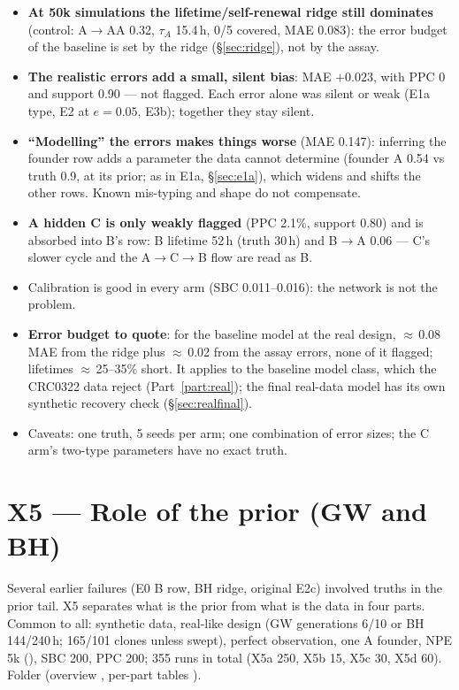 \documentclass[10pt,a4paper]{article}
\newcommand{\tA}{$\tau_A$}
\newcommand{\res}[1]{\texttt{\detokenize{#1}}}  %
\newcommand{\code}[1]{\texttt{\detokenize{#1}}}
\begin{document}
\begin{itemize}
\item \textbf{At 50k simulations the lifetime/self-renewal ridge still dominates} (control: A$\to$AA 0.32, \tA{} 15.4\,h, 0/5 covered, MAE 0.083): the error budget of the baseline is set by the ridge (\S\ref{sec:ridge}), not by the assay.
\item \textbf{The realistic errors add a small, silent bias}: MAE $+0.023$, with PPC 0 and support 0.90 --- not flagged. Each error alone was silent or weak (E1a type, E2 at $e = 0.05$, E3b); together they stay silent.
\item \textbf{``Modelling'' the errors makes things worse} (MAE 0.147): inferring the founder row adds a parameter the data cannot determine (founder A 0.54 vs truth 0.9, at its prior; as in E1a, \S\ref{sec:e1a}), which widens and shifts the other rows. Known mis-typing and shape do not compensate.
\item \textbf{A hidden C is only weakly flagged} (PPC 2.1\%, support 0.80) and is absorbed into B's row: B lifetime 52\,h (truth 30\,h) and B$\to$A 0.06 --- C's slower cycle and the A$\to$C$\to$B flow are read as B.
\item Calibration is good in every arm (SBC 0.011--0.016): the network is not the problem.
\item \textbf{Error budget to quote}: for the baseline model at the real design, $\approx$\,0.08 MAE from the ridge plus $\approx$\,0.02 from the assay errors, none of it flagged; lifetimes $\approx$\,25--35\% short. It applies to the baseline model class, which the CRC0322 data reject (Part~\ref{part:real}); the final real-data model has its own synthetic recovery check (\S\ref{sec:realfinal}).
\item Caveats: one truth, 5 seeds per arm; one combination of error sizes; the C arm's two-type parameters have no exact truth.
\end{itemize}

\section{X5 --- Role of the prior (GW and BH)}\label{sec:x5}
Several earlier failures (E0 B row, BH ridge, original E2c) involved truths in the prior tail. X5 separates what is the prior from what is the data in four parts. Common to all: synthetic data, real-like design (GW generations 6/10 or BH 144/240\,h; 165/101 clones unless swept), perfect observation, one A founder, NPE 5k (\code{budget=dev}), SBC 200, PPC 200; 355 runs in total (X5a 250, X5b 15, X5c 30, X5d 60). Folder \res{results/x5/} (overview \res{info.md}, per-part tables \res{x5*_findings.md}).
\end{document}
